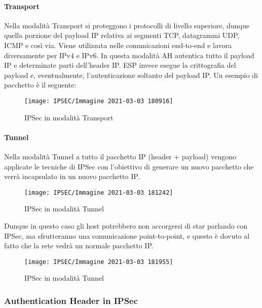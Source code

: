 \documentclass[14pt]{extreport}
\begin{document}
\paragraph{Transport}
Nella modalità Transport si proteggono i protocolli di livello superiore, dunque quella porzione del payload IP relativa ai segmenti TCP, datagrammi UDP, ICMP e così via. Viene utilizzata nelle comunicazioni end-to-end e lavora diversamente per IPv4 e IPv6.
In questa modalità AH autentica tutto il payload IP e determinate parti dell'header IP. ESP invece esegue la crittografia del payload e, eventualmente, l'autenticazione soltanto del payload IP.
Un esempio di pacchetto è il seguente:


\begin{figure}[H]
    \centering
    \texttt{[image: IPSEC/Immagine 2021-03-03 180916]}
    \caption{IPSec in modalità Transport}
    \label{IPSEC5}
\end{figure}



\paragraph{Tunnel}



Nella modalità Tunnel a tutto il pacchetto IP (header + payload) vengono applicate le tecniche di IPSec con l'obiettivo di generare un nuovo pacchetto che verrà incapsulato in un nuovo pacchetto IP.
\begin{figure}[H]
    \centering
    \texttt{[image: IPSEC/Immagine 2021-03-03 181242]}
    \caption{IPSec in modalità Tunnel}
    \label{IPSEC6}
\end{figure}



Dunque in questo caso gli host potrebbero non accorgersi di star parlando con IPSec, ma sfrutteranno una comunicazione point-to-point, e questo è dovuto al fatto che la rete vedrà un normale pacchetto IP.

\begin{figure}[H]
    \centering
    \texttt{[image: IPSEC/Immagine 2021-03-03 181955]}
    \caption{IPSec in modalità Tunnel}
    \label{IPSEC7}
\end{figure}



\subsubsection{Authentication Header in IPSec}
\end{document}
